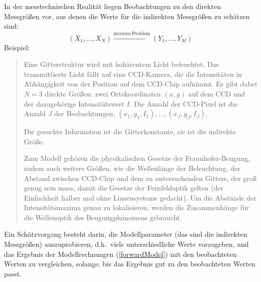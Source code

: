 In der messtechnischen Realität liegen Beobachtungen zu den direkten Messgrößen vor, aus denen die Werte für die
indirekten Messgrößen zu schätzen sind:
\begin{equation}
(X_1, \dots, X_N) \xrightarrow{\mathrm{inverses \; Problem}} (Y_1, \dots, Y_M)
\label{inverseProblem}
\end{equation}
Beispiel:
\begin{quote}
Eine Gitterstruktur wird mit kohärentem Licht beleuchtet. Das transmittierte Licht fällt auf eine CCD-Kamera, die
die Intensitäten in Abhängigkeit von der Position auf dem CCD-Chip aufnimmt. Es gibt dabei $N = 3$ direkte Größen:
zwei Ortskoordinaten $(x, y)$ auf dem CCD und der dazugehörige Intensitätswert $I$. Die Anzahl der CCD-Pixel ist die
Anzahl $J$ der Beobachtungen, $(x_1, y_1, I_1), \dots, (x_J, y_J, I_J)$.

Die gesuchte Information ist die Gitterkonstante, sie ist die indirekte Größe. 

Zum Modell gehören die physikalischen Gesetze der Fraunhofer-Beugung, zudem auch weitere Größen, wie die Wellenlänge
der Beleuchtung, der Abstand zwischen CCD-Chip und dem zu untersuchenden Gitters, der groß genug sein muss, damit die
Gesetze der Fernfeldoptik gelten (der Einfachheit halber mal ohne Linsensysteme gedacht). Um die Abstände der Intensitätsmaxima
genau zu lokalisieren, werden die Zusammenhänge für die Wellenoptik des Beugungphänomens gebraucht.
\end{quote}

Ein Schätzvorgang besteht darin, die Modellparameter (das sind die indirekten Messgrößen) auszuprobieren, d.h.\
viele unterschiedliche Werte vorzugeben, und
das Ergebnis der Modellrechnungen (\ref{forwardModel}) mit den beobachteten Werten zu vergleichen, solange,
bis das Ergebnis \glqq gut zu den beobachteten Werten passt\grqq.

